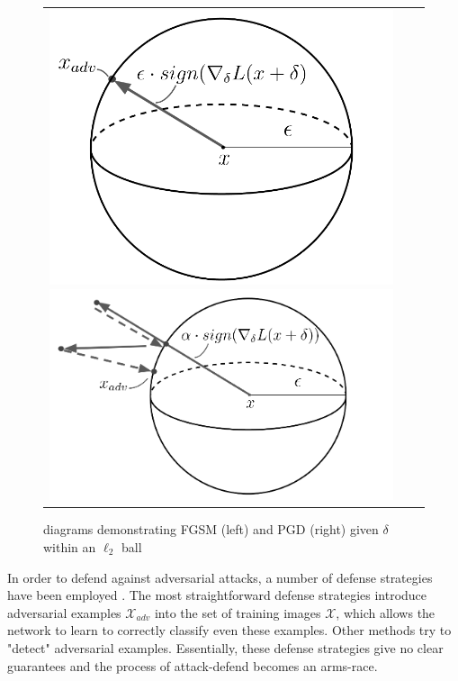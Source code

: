 \documentclass[twoside]{article}
\theoremstyle{definition}
\begin{document}
\begin{figure}[H]
    \caption{diagrams demonstrating FGSM (left) and PGD (right) given $\delta$ within an $\ell_2$ ball}
    \centering
    \begin{tabular}{ccc}
    \includegraphics[scale=0.2]{./FGSM.png}
    \includegraphics[scale=0.2]{./PGD.png}
    \end{tabular}
    \label{fig:my_label}
\end{figure}


In order to defend against adversarial attacks, a number of defense strategies have been employed \cite{athalye2018}.
The most straightforward defense strategies introduce adversarial examples $\mathcal{X}_{adv}$ into the set of training images
$\mathcal{X}$, which allows the network to learn to correctly classify even these examples. Other methods try to 
"detect" adversarial examples. Essentially, these defense strategies give no clear guarantees and the process of
attack-defend becomes an arms-race. 
\end{document}

